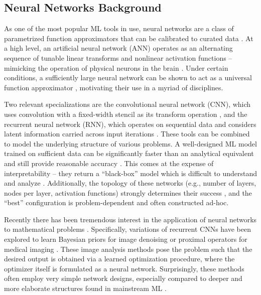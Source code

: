 \documentclass[3p, preprint]{elsarticle}
\begin{document}
\subsection{Neural Networks Background}\label{subsec:MLBackground}

As one of the most popular ML tools in use, neural networks are a class of parametrized function approximators that can be calibrated to curated data \cite{Schmidhuber_2015}. At a high level, an artificial neural network (ANN) operates as an alternating sequence of tunable linear transforms and nonlinear activation functions -- mimicking the operation of physical neurons in the brain \cite{mccullock1988_neuralnets, rosenblatt1957perceptron}. Under certain conditions, a sufficiently large neural network can be shown to act as a universal function approximator \cite{Cybenko1989ApproximationBS, Pinkus1999ApproximationTO}, motivating their use in a myriad of disciplines.

Two relevant specializations are the convolutional neural network (CNN), which uses convolution with a fixed-width stencil as its transform operation \cite{lecun1998_CNNs,krizhevvsky2012_alexnet}, and the recurrent neural network (RNN), which operates on sequential data and considers latent information carried across input iterations \cite{lipton2015rnn}. These tools can be combined to model the underlying structure of various problems. A well-designed ML model trained on sufficient data can be significantly faster than an analytical equivalent and still provide reasonable accuracy \cite{streib_2020}. This comes at the expense of interpretability -- they return a ``black-box'' model which is difficult to understand and analyze \cite{buhrmester2019analysis}. Additionally, the topology of these networks (e.g., number of layers, nodes per layer, activation functions) strongly determines their success \cite{Ojha_architecture}, and the ``best'' configuration is problem-dependent and often constructed ad-hoc.

Recently there has been tremendous interest in the application of neural networks to mathematical problems \cite{carleo_2019physicsML}. Specifically, variations of recurrent CNNs have been explored \cite{andrychowicz2016learning} to learn Bayesian priors for image denoising \cite{putzky2017} or proximal operators for medical imaging \cite{adler2018}. These image analysis methods pose the problem such that the desired output is obtained via a learned optimization procedure, where the optimizer itself is formulated as a neural network. Surprisingly, these methods often employ very simple network designs, especially compared to deeper and more elaborate structures found in mainstream ML \cite{He_resnet, Iandola_squeezenet}. 
\end{document}
